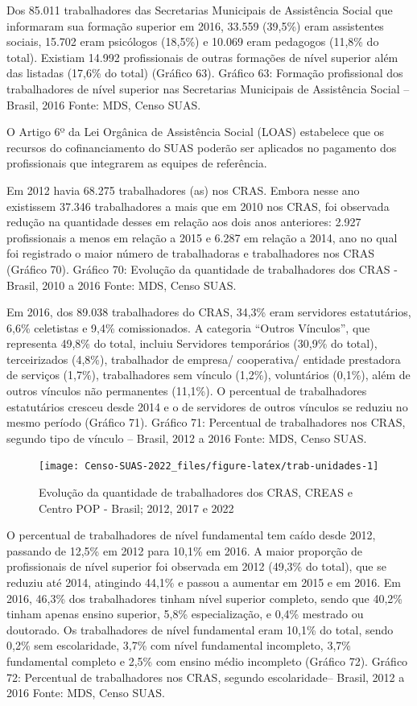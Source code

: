 \documentclass[
  brazilian]{report}
\begin{document}
Dos 85.011 trabalhadores das Secretarias Municipais de Assistência
Social que informaram sua formação superior em 2016, 33.559 (39,5\%)
eram assistentes sociais, 15.702 eram psicólogos (18,5\%) e 10.069 eram
pedagogos (11,8\% do total). Existiam 14.992 profissionais de outras
formações de nível superior além das listadas (17,6\% do total) (Gráfico
63). Gráfico 63: Formação profissional dos trabalhadores de nível
superior nas Secretarias Municipais de Assistência Social -- Brasil,
2016 Fonte: MDS, Censo SUAS.

O Artigo 6º da Lei Orgânica de Assistência Social (LOAS) estabelece que
os recursos do cofinanciamento do SUAS poderão ser aplicados no
pagamento dos profissionais que integrarem as equipes de referência.

Em 2012 havia 68.275 trabalhadores (as) nos CRAS. Embora nesse ano
existissem 37.346 trabalhadores a mais que em 2010 nos CRAS, foi
observada redução na quantidade desses em relação aos dois anos
anteriores: 2.927 profissionais a menos em relação a 2015 e 6.287 em
relação a 2014, ano no qual foi registrado o maior número de
trabalhadoras e trabalhadores nos CRAS (Gráfico 70). Gráfico 70:
Evolução da quantidade de trabalhadores dos CRAS - Brasil, 2010 a 2016
Fonte: MDS, Censo SUAS.

Em 2016, dos 89.038 trabalhadores do CRAS, 34,3\% eram servidores
estatutários, 6,6\% celetistas e 9,4\% comissionados. A categoria
``Outros Vínculos'', que representa 49,8\% do total, incluiu Servidores
temporários (30,9\% do total), terceirizados (4,8\%), trabalhador de
empresa/ cooperativa/ entidade prestadora de serviços (1,7\%),
trabalhadores sem vínculo (1,2\%), voluntários (0,1\%), além de outros
vínculos não permanentes (11,1\%). O percentual de trabalhadores
estatutários cresceu desde 2014 e o de servidores de outros vínculos se
reduziu no mesmo período (Gráfico 71). Gráfico 71: Percentual de
trabalhadores nos CRAS, segundo tipo de vínculo -- Brasil, 2012 a 2016
Fonte: MDS, Censo SUAS.

\begin{figure}
\texttt{[image: Censo-SUAS-2022\_files/figure-latex/trab-unidades-1]} \caption[ Evolução da quantidade de trabalhadores dos CRAS, CREAS e Centro POP - Brasil]{ Evolução da quantidade de trabalhadores dos CRAS, CREAS e Centro POP - Brasil; 2012, 2017 e 2022}\label{fig:trab-unidades}
\end{figure}

O percentual de trabalhadores de nível fundamental tem caído desde 2012,
passando de 12,5\% em 2012 para 10,1\% em 2016. A maior proporção de
profissionais de nível superior foi observada em 2012 (49,3\% do total),
que se reduziu até 2014, atingindo 44,1\% e passou a aumentar em 2015 e
em 2016. Em 2016, 46,3\% dos trabalhadores tinham nível superior
completo, sendo que 40,2\% tinham apenas ensino superior, 5,8\%
especialização, e 0,4\% mestrado ou doutorado. Os trabalhadores de nível
fundamental eram 10,1\% do total, sendo 0,2\% sem escolaridade, 3,7\%
com nível fundamental incompleto, 3,7\% fundamental completo e 2,5\% com
ensino médio incompleto (Gráfico 72). Gráfico 72: Percentual de
trabalhadores nos CRAS, segundo escolaridade-- Brasil, 2012 a 2016
Fonte: MDS, Censo SUAS.
\end{document}
